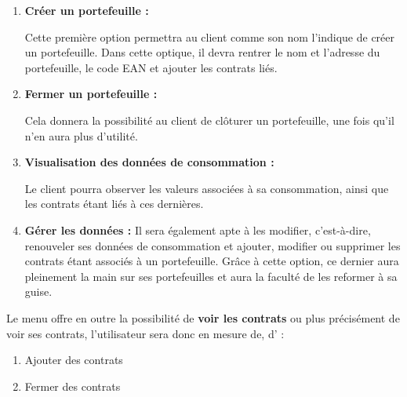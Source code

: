\begin{enumerate}[-]
\item \textbf{Créer un portefeuille : }\newline

Cette première option permettra au client comme son nom l’indique de créer un portefeuille. \newline
Dans cette optique, il devra rentrer le nom et l’adresse du portefeuille, le code EAN et ajouter les contrats liés.

\item \textbf{Fermer un portefeuille :}\newline

Cela donnera la possibilité au client de clôturer un portefeuille, une fois qu’il n’en aura plus d’utilité.

\item \textbf{Visualisation des données de consommation :}\newline

Le client pourra observer les valeurs associées à sa consommation, ainsi que les contrats étant liés à ces dernières.

\item \textbf{Gérer les données :} \newline
Il sera également apte à les modifier, c’est-à-dire, renouveler ses données de consommation et ajouter, modifier ou supprimer les contrats étant associés à un portefeuille.\newline
Grâce à cette option, ce dernier aura pleinement la main sur ses portefeuilles et aura la faculté de les reformer à sa guise.
\end{enumerate}

\newpage

\begin{flushleft}
Le menu offre en outre la possibilité de \textbf{voir les contrats} ou plus précisément de voir ses contrats, l’utilisateur sera donc en mesure de, d’ :
\end{flushleft}
\begin{enumerate}[1.]
\item Ajouter des contrats
\item Fermer des contrats
\end{enumerate}

